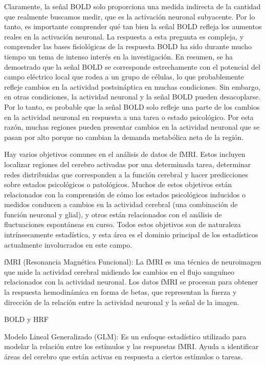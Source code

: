 Claramente, la señal BOLD solo proporciona una medida indirecta de la cantidad que realmente buscamos medir, que es la activaci\'on neuronal subyacente. Por lo tanto, es importante comprender qu\'e tan bien la señal BOLD refleja los aumentos reales en la activación neuronal. La respuesta a esta pregunta es compleja, y comprender las bases fisiológicas de la respuesta BOLD ha sido durante mucho tiempo un tema de intenso interés en la investigación. En resumen, se ha demostrado que la señal BOLD se corresponde estrechamente con el potencial del campo eléctrico local que rodea a un grupo de células, lo que probablemente refleje cambios en la actividad postsináptica en muchas condiciones. Sin embargo, en otras condiciones, la actividad neuronal y la señal BOLD pueden desacoplarse. Por lo tanto, es probable que la señal BOLD solo refleje una parte de los cambios en la actividad neuronal en respuesta a una tarea o estado psicológico. Por esta razón, muchas regiones pueden presentar cambios en la actividad neuronal que se pasan por alto porque no cambian la demanda metabólica neta de la región.

Hay varios objetivos comunes en el análisis de datos de fMRI. Estos incluyen localizar regiones del cerebro activadas por una determinada tarea, determinar redes distribuidas que corresponden a la función cerebral y hacer predicciones sobre estados psicológicos o patológicos. Muchos de estos objetivos están relacionados con la comprensión de cómo los estados psicológicos inducidos o medidos conducen a cambios en la actividad cerebral (una combinación de función neuronal y glial), y otros están relacionados con el análisis de fluctuaciones espontáneas en curso. Todos estos objetivos son de naturaleza intrínsecamente estadística, y esta área es el dominio principal de los estadísticos actualmente involucrados en este campo.


fMRI (Resonancia Magnética Funcional): La fMRI es una técnica de neuroimagen que mide la actividad cerebral midiendo los cambios en el flujo sanguíneo relacionados con la actividad neuronal. Los datos fMRI se procesan para obtener la respuesta hemodinámica en forma de betas, que representan la fuerza y dirección de la relación entre la actividad neuronal y la señal de la imagen.

BOLD y HRF 

Modelo Lineal Generalizado (GLM): Es un enfoque estadístico utilizado para modelar la relación entre los estímulos y las respuestas fMRI. Ayuda a identificar áreas del cerebro que están activas en respuesta a ciertos estímulos o tareas.

